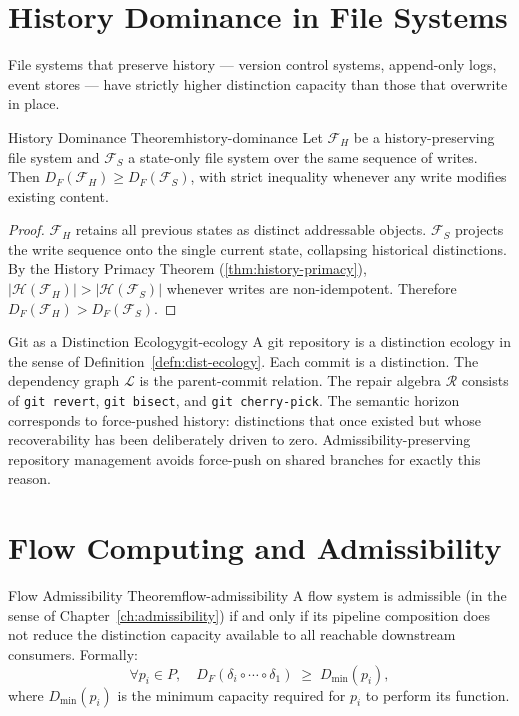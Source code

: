 \documentclass[12pt,twoside,openright]{book}
\newcommand{\csicon} {\marginpar{\tiny\color{DistBlue}\faCode}}
\newcommand{\bioicon}{\marginpar{\tiny\color{DistTeal}\faDna}}
\newcommand{\hist}{\mathcal{H}}
\begin{document}
\section{History Dominance in File Systems}

\bioicon\csicon
File systems that preserve history — version control
systems, append-only logs, event stores — have strictly
higher distinction capacity than those that overwrite
in place.

\begin{theorem}{History Dominance Theorem}{history-dominance}
  Let $\mathcal{F}_H$ be a history-preserving file system
  and $\mathcal{F}_S$ a state-only file system over the
  same sequence of writes.
  Then $D_F(\mathcal{F}_H) \ge D_F(\mathcal{F}_S)$,
  with strict inequality whenever any write modifies
  existing content.
\end{theorem}

\begin{proof}
  $\mathcal{F}_H$ retains all previous states as distinct
  addressable objects.
  $\mathcal{F}_S$ projects the write sequence onto the
  single current state, collapsing historical distinctions.
  By the History Primacy Theorem
  (\cref{thm:history-primacy}),
  $|\hist(\mathcal{F}_H)| > |\hist(\mathcal{F}_S)|$
  whenever writes are non-idempotent.
  Therefore $D_F(\mathcal{F}_H) > D_F(\mathcal{F}_S)$.
\end{proof}

\begin{example}{Git as a Distinction Ecology}{git-ecology}
  \csicon
  A git repository is a distinction ecology in the sense
  of Definition~\ref{defn:dist-ecology}. Each commit is a
  distinction. The dependency graph $\mathcal{L}$ is the
  parent-commit relation. The repair algebra $\mathcal{R}$
  consists of \texttt{git revert}, \texttt{git bisect},
  and \texttt{git cherry-pick}. The semantic horizon
  corresponds to force-pushed history: distinctions that
  once existed but whose recoverability has been
  deliberately driven to zero. Admissibility-preserving
  repository management avoids force-push on shared
  branches for exactly this reason.
\end{example}

\section{Flow Computing and Admissibility}

\begin{theorem}{Flow Admissibility Theorem}{flow-admissibility}
  A flow system is admissible (in the sense of
  Chapter~\ref{ch:admissibility}) if and only if its
  pipeline composition does not reduce the distinction
  capacity available to all reachable downstream consumers.
  Formally:
  \[
    \forall p_i \in P,\quad
    D_F(\delta_i \circ \cdots \circ \delta_1)
    \;\ge\;
    D_{\min}(p_i),
  \]
  where $D_{\min}(p_i)$ is the minimum capacity
  required for $p_i$ to perform its function.
\end{theorem}
\end{document}
